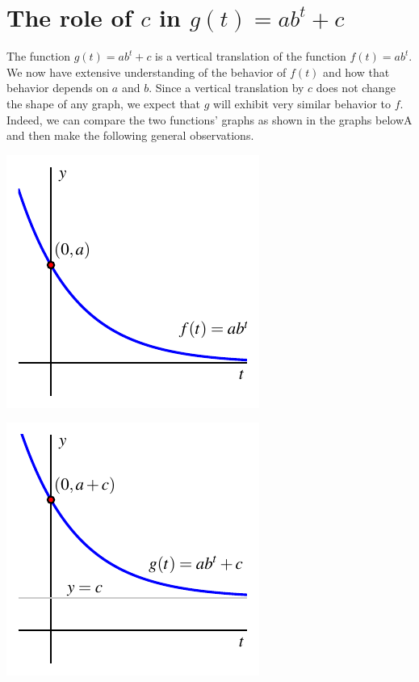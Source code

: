 \documentclass[nooutcomes]{ximera}
\begin{document}

\section{The role of $c$ in $g(t) = ab^t + c$}

The function $g(t) = ab^t + c$ is a vertical translation of the function $f(t) = ab^t$.  We now have extensive understanding of the behavior of $f(t)$ and how that behavior depends on $a$ and $b$.  Since a vertical translation by $c$ does not change the shape of any graph, we expect that $g$ will exhibit very similar behavior to $f$.  Indeed, we can compare the two functions' graphs as shown in the graphs belowA and then make the following general observations.

\begin{image}
\includegraphics{modeling-vert-transl-0}
\end{image}

\begin{image}
\includegraphics{modeling-vert-transl-c}
\end{image}
\end{document}
